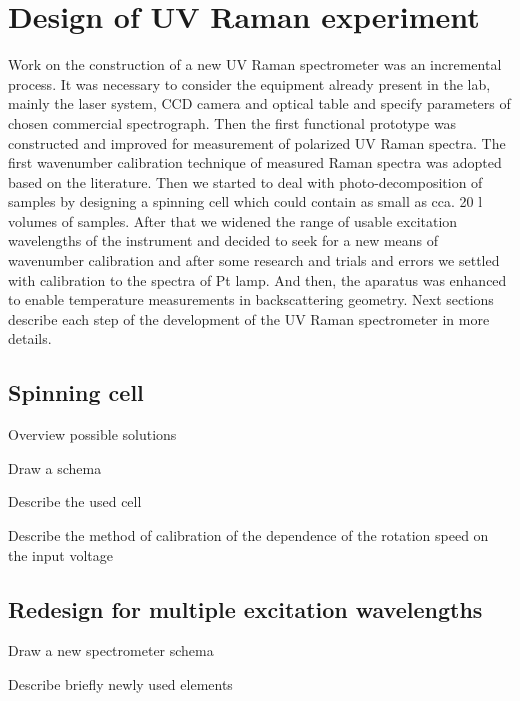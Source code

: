 \section{Design of UV Raman experiment}

Work on the construction of a new UV Raman spectrometer was an incremental
process. It was necessary to consider the equipment already present in the lab,
mainly the laser system, CCD camera and optical table and specify parameters of
chosen commercial spectrograph. Then the first functional prototype was
constructed and improved for measurement of polarized UV Raman spectra. The
first wavenumber calibration technique of measured Raman spectra
was adopted based on the literature. Then we started to deal with
photo-decomposition of samples by designing a spinning cell which could contain
as small as cca. 20 l volumes of samples. After that we widened the range
of usable excitation wavelengths of the instrument and decided to seek for a
new means of wavenumber calibration and after some research and trials and
errors we settled with calibration to the spectra of Pt lamp. And then, the
aparatus was enhanced to enable temperature measurements in backscattering
geometry. Next sections describe each step of the development of the UV Raman
spectrometer in more details.










\subsection{Spinning cell}
\begin{docitemize}
	\item Overview possible solutions
	\item Draw a schema
	\item Describe the used cell
	\item Describe the method of calibration of the dependence of the rotation
	speed on the input voltage
\end{docitemize}


\subsection{Redesign for multiple excitation wavelengths}
\begin{docitemize}
	\item Draw a new spectrometer schema
	\item Describe briefly newly used elements
\end{docitemize}


